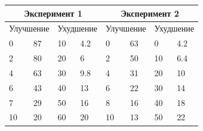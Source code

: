 \documentclass{article}
\begin{document}
\begin{table}[h!]\centering
    \begin{tabular}{llllllll}
        \hline
        \multicolumn{4}{|c|}{Эксперимент 1} & \multicolumn{4}{|c|}{Эксперимент 2}                                                                                                                                                                                   \\\hline
        \multicolumn{2}{|c|}{Улучшение}     & \multicolumn{2}{|c|}{Ухудшение}     & \multicolumn{2}{|c|}{Улучшение} & \multicolumn{2}{|c|}{Ухудшение}                                                                                                               \\\hline
        \multicolumn{1}{|l|}{0  }           & \multicolumn{1}{|l|}{87 }           & \multicolumn{1}{|l|}{10 }       & \multicolumn{1}{|l|}{4.2}       & \multicolumn{1}{|l|}{0 } & \multicolumn{1}{|l|}{63 } & \multicolumn{1}{|l|}{0 } & \multicolumn{1}{|l|}{4.2} \\\hline
        \multicolumn{1}{|l|}{2  }           & \multicolumn{1}{|l|}{80 }           & \multicolumn{1}{|l|}{20 }       & \multicolumn{1}{|l|}{6  }       & \multicolumn{1}{|l|}{2 } & \multicolumn{1}{|l|}{50 } & \multicolumn{1}{|l|}{10} & \multicolumn{1}{|l|}{6.4} \\\hline
        \multicolumn{1}{|l|}{4  }           & \multicolumn{1}{|l|}{63 }           & \multicolumn{1}{|l|}{30 }       & \multicolumn{1}{|l|}{9.8}       & \multicolumn{1}{|l|}{4 } & \multicolumn{1}{|l|}{31 } & \multicolumn{1}{|l|}{20} & \multicolumn{1}{|l|}{10}  \\\hline
        \multicolumn{1}{|l|}{6  }           & \multicolumn{1}{|l|}{43 }           & \multicolumn{1}{|l|}{40 }       & \multicolumn{1}{|l|}{13 }       & \multicolumn{1}{|l|}{6 } & \multicolumn{1}{|l|}{22 } & \multicolumn{1}{|l|}{30} & \multicolumn{1}{|l|}{14}  \\\hline
        \multicolumn{1}{|l|}{7  }           & \multicolumn{1}{|l|}{29 }           & \multicolumn{1}{|l|}{50 }       & \multicolumn{1}{|l|}{16 }       & \multicolumn{1}{|l|}{8 } & \multicolumn{1}{|l|}{16 } & \multicolumn{1}{|l|}{40} & \multicolumn{1}{|l|}{18}  \\\hline
        \multicolumn{1}{|l|}{10 }           & \multicolumn{1}{|l|}{20 }           & \multicolumn{1}{|l|}{60 }       & \multicolumn{1}{|l|}{20 }       & \multicolumn{1}{|l|}{10} & \multicolumn{1}{|l|}{13 } & \multicolumn{1}{|l|}{50} & \multicolumn{1}{|l|}{22}  \\\hline

\end{tabular}
\end{table}
\end{document}
